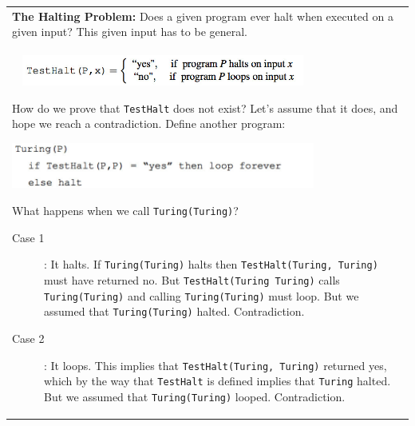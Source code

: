 {\tabulinesep=1mm
\begin{tabu}{|p{16cm} |}
\hline 
\textbf{The Halting Problem:} Does a given program ever halt when executed 
on a given input? This given input has to be general. \\
\begin{center}
\includegraphics[width=10cm, height=1cm]{intro_testhalt.jpg}
\end{center}

How do we prove that \texttt{TestHalt} does not exist? Let's assume that it does, 
and hope we reach a contradiction. \newline
Define another program:
\begin{center}
\includegraphics[width=10cm, height=1.5cm]{intro_turing.jpg}
\end{center}
What happens when we call \texttt{Turing(Turing)}?
\begin{description}
\item[Case 1]: It halts.
If \texttt{Turing(Turing)} halts then \texttt{TestHalt(Turing, Turing)} 
must have returned no. But \texttt{TestHalt(Turing Turing)} calls 
\texttt{Turing(Turing)} and calling \texttt{Turing(Turing)} must loop. 
But we assumed that \texttt{Turing(Turing)} halted. Contradiction.
\item[Case 2]: It loops.
This implies that \texttt{TestHalt(Turing, Turing)} returned yes, which by the 
way that \texttt{TestHalt} is defined implies that \texttt{Turing} halted. 
But we assumed  that \texttt{Turing(Turing)} looped. Contradiction.
\end{description}
\\
\hline
\end{tabu}
}

